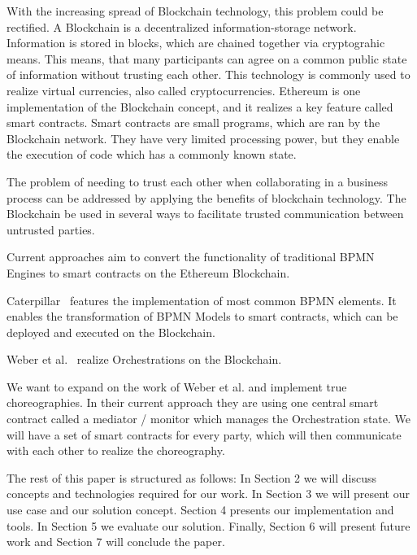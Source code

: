 \documentclass[runningheads]{llncs}
\begin{document}
With the increasing spread of Blockchain technology, this problem could be rectified.
A Blockchain is a decentralized information-storage network. Information is stored in blocks, which are chained together via cryptograhic means. This means, that many participants can agree on a common public state of information without trusting each other. This technology is commonly used to realize virtual currencies, also called cryptocurrencies.
Ethereum \cite{wood2014ethereum} is one implementation of the Blockchain concept, and it realizes a key feature called smart contracts.
Smart contracts are small programs, which are ran by the Blockchain network. They have very limited processing power, but they enable the execution of code which has a commonly known state.

The problem of needing to trust each other when collaborating in a business process can be addressed by applying the benefits of blockchain technology. The Blockchain be used in several ways to facilitate trusted communication between untrusted parties.

Current approaches aim to convert the functionality of traditional BPMN Engines to smart contracts on the Ethereum Blockchain.

Caterpillar~\cite{lopez2017caterpillar} features the implementation of most common BPMN elements. It enables the transformation of BPMN Models to smart contracts, which can be deployed and executed on the Blockchain.

Weber et al.~\cite{weber2016untrusted} realize Orchestrations on the Blockchain.

We want to expand on the work of Weber et al. and implement true choreographies. In their current approach they are using one central smart contract called a mediator / monitor which manages the Orchestration state.
We will have a set of smart contracts for every party, which will then communicate with each other to realize the choreography.

The rest of this paper is structured as follows: In Section 2 we will discuss concepts and technologies required for our work.
In Section 3 we will present our use case and our solution concept.
Section 4 presents our implementation and tools.
In Section 5 we evaluate our solution.
Finally, Section 6 will present future work and Section 7 will conclude the paper.
\end{document}
